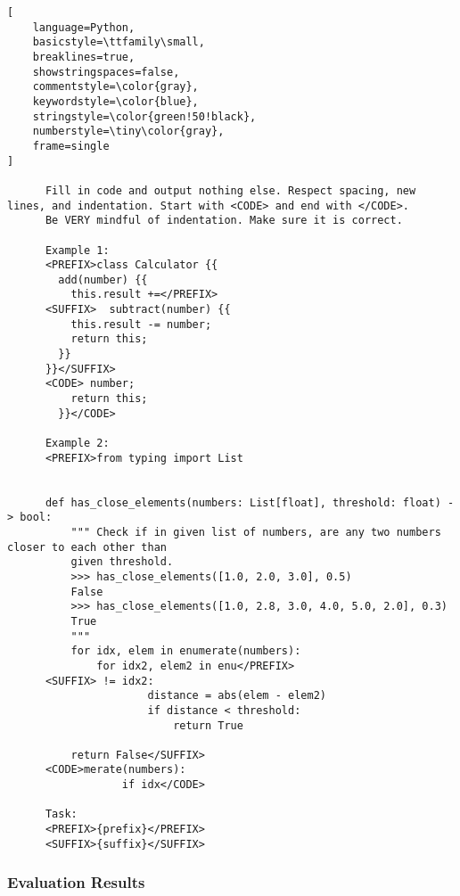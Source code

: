 \begin{minipage}{0.9\textwidth}
\begin{lstlisting}[
    language=Python,
    basicstyle=\ttfamily\small,
    breaklines=true,
    showstringspaces=false,
    commentstyle=\color{gray},
    keywordstyle=\color{blue},
    stringstyle=\color{green!50!black},
    numberstyle=\tiny\color{gray},
    frame=single
]

      Fill in code and output nothing else. Respect spacing, new lines, and indentation. Start with <CODE> and end with </CODE>.
      Be VERY mindful of indentation. Make sure it is correct.

      Example 1:
      <PREFIX>class Calculator {{
        add(number) {{
          this.result +=</PREFIX>
      <SUFFIX>  subtract(number) {{
          this.result -= number;
          return this;
        }}
      }}</SUFFIX>
      <CODE> number;
          return this;
        }}</CODE>

      Example 2:
      <PREFIX>from typing import List


      def has_close_elements(numbers: List[float], threshold: float) -> bool:
          """ Check if in given list of numbers, are any two numbers closer to each other than
          given threshold.
          >>> has_close_elements([1.0, 2.0, 3.0], 0.5)
          False
          >>> has_close_elements([1.0, 2.8, 3.0, 4.0, 5.0, 2.0], 0.3)
          True
          """
          for idx, elem in enumerate(numbers):
              for idx2, elem2 in enu</PREFIX>
      <SUFFIX> != idx2:
                      distance = abs(elem - elem2)
                      if distance < threshold:
                          return True

          return False</SUFFIX>
      <CODE>merate(numbers):
                  if idx</CODE>

      Task:
      <PREFIX>{prefix}</PREFIX>
      <SUFFIX>{suffix}</SUFFIX>

\end{lstlisting}
\end{minipage}
\newpage

\subsubsection{Evaluation Results}

